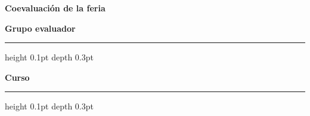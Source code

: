\makeatletter
{}
\makeatother

\usepackage[spanish,es-nodecimaldot]{babel}
\usepackage{lmodern}

\geometry{letterpaper,margin=0.25in}
\hypersetup{pdfprintscaling=None}
\pagestyle{empty}
\linespread{1}
\setlength{\parskip}{0pt}
\setlength{\tabcolsep}{2.5pt}
\setlength{\arrayrulewidth}{0.4pt}
\setlength{\extrarowheight}{0.7pt}
\renewcommand{\arraystretch}{1}


\newcommand{\writingrule}{%
  \leaders\hrule height 0.1pt depth 0.3pt\hfill\kern0pt}
\newcommand{\field}[1]{%
  \rule[-2pt]{0pt}{15pt}\textbf{#1}\enspace\writingrule}

\newcommand{\category}[1]{%
  \multicolumn{5}{|l|}{\cellcolor{black!9}\textbf{#1}}\\\hline}
\newcommand{\criterion}[1]{#1 & & & & \\\hline}
\newcommand{\projectheading}[1]{{\scriptsize\bfseries Proyecto\newline #1}}

\newcommand{\responseblock}[1]{%
  \fcolorbox{gridgray}{white}{%
    \begin{minipage}[t]{\dimexpr0.49\linewidth-2\fboxsep-2\fboxrule\relax}
      \textbf{Proyecto #1}\par
      \field{Problemática}\par
      \field{Fortaleza}\par
      \field{Mejora concreta}\par
      \field{Solución alternativa}\par
      \field{Cómo o por qué}\par
    \end{minipage}}%
}



{\Large\bfseries Coevaluación de la feria\par}
\vspace{3pt}
\begin{minipage}[t]{0.72\linewidth}
  \field{Grupo evaluador}
\end{minipage}\hfill
\begin{minipage}[t]{0.25\linewidth}
  \field{Curso}
\end{minipage}\par

